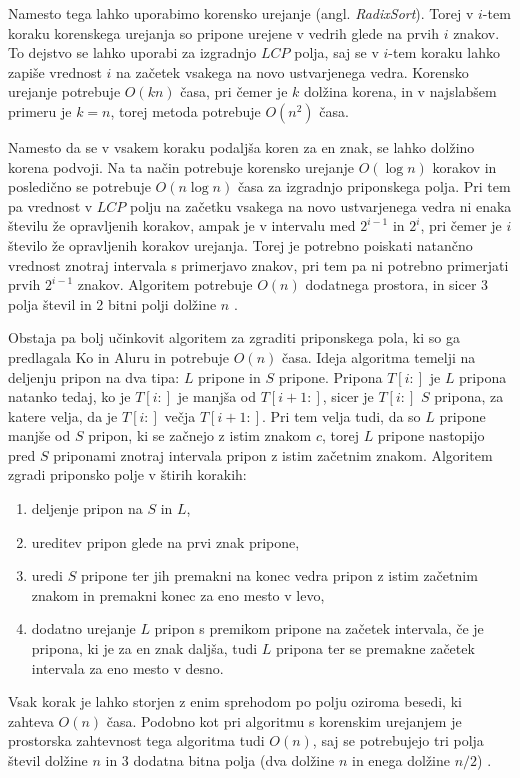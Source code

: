 Namesto tega lahko uporabimo korensko urejanje (angl. \textit{RadixSort}). Torej v $i$-tem koraku korenskega urejanja so pripone urejene v vedrih glede na prvih $i$ znakov. To dejstvo se lahko uporabi za izgradnjo $LCP$ polja, saj se v $i$-tem koraku lahko zapiše vrednost $i$ na začetek vsakega na novo ustvarjenega vedra. Korensko urejanje potrebuje $O(kn)$ časa, pri čemer je $k$ dolžina korena, in v najslabšem primeru je $k=n$, torej metoda potrebuje $O(n^2)$ časa.

Namesto da se v vsakem koraku podaljša koren za en znak, se lahko dolžino korena podvoji. Na ta način potrebuje korensko urejanje $O(\log{n})$ korakov in posledično se potrebuje $O(n\log{n})$ časa za izgradnjo priponskega polja. Pri tem pa vrednost v $LCP$ polju na začetku vsakega na novo ustvarjenega vedra ni enaka številu že opravljenih korakov, ampak je v intervalu med $2^{i-1}$ in $2^{i}$, pri čemer je $i$ število že opravljenih korakov urejanja. Torej je potrebno poiskati natančno vrednost znotraj intervala s primerjavo znakov, pri tem pa ni potrebno primerjati prvih $2^{i-1}$ znakov. Algoritem potrebuje $O(n)$ dodatnega prostora, in sicer 3 polja števil in 2 bitni polji dolžine $n$ \cite{Manber1990}.


Obstaja pa bolj učinkovit algoritem za zgraditi priponskega pola, ki so ga predlagala Ko in Aluru \cite{Ko2005} in potrebuje $O(n)$ časa. Ideja algoritma temelji na deljenju pripon na dva tipa: $L$ pripone in $S$ pripone. Pripona $T[i:]$ je $L$ pripona natanko tedaj, ko je $T[i:]$ je manjša od $T[i+1:]$, sicer je $T[i:]$ $S$ pripona, za katere velja, da je $T[i:]$ večja $T[i+1:]$. Pri tem velja tudi, da so $L$ pripone manjše od $S$ pripon, ki se začnejo z istim znakom $c$, torej $L$ pripone nastopijo pred $S$ priponami znotraj intervala pripon z istim začetnim znakom. Algoritem zgradi priponsko polje v štirih korakih:
\begin{enumerate}
    \item deljenje pripon na $S$ in $L$,
    \item ureditev pripon glede na prvi znak pripone,
    \item uredi $S$ pripone ter jih premakni na konec vedra pripon z istim začetnim znakom in premakni konec za eno mesto v levo,
    \item dodatno urejanje $L$ pripon s premikom pripone na začetek intervala, če je pripona, ki je za en znak daljša, tudi $L$ pripona ter se premakne začetek intervala za eno mesto v desno.
\end{enumerate}
Vsak korak je lahko storjen z enim sprehodom po polju oziroma besedi, ki zahteva $O(n)$ časa. Podobno kot pri algoritmu s korenskim urejanjem je prostorska zahtevnost tega algoritma tudi $O(n)$, saj se potrebujejo tri polja števil dolžine $n$ in 3 dodatna bitna polja (dva dolžine $n$ in enega dolžine $n/2$) \cite{Ko2005}.